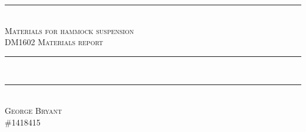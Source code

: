 \begin{titlepage}
\begin{flushright}
\null
\vfill
\rule{16cm}{1.5pt}\\[3mm]
\textsc{\Huge Materials for hammock suspension}\\
\textsc{\Large DM1602 Materials report}\\
\rule{16cm}{1pt}\\[3mm]
\vspace{8cm}
\rule{3.5cm}{1pt}\\
\textsc{\large George Bryant}\\
\#1418415
\end{flushright}
\end{titlepage}